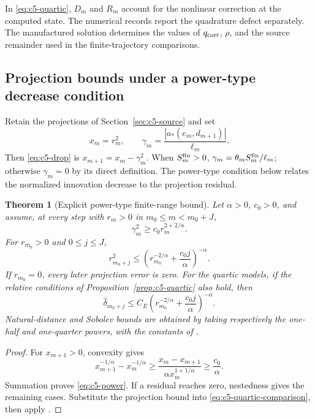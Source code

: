 \documentclass[11pt]{article}
\newtheorem{theorem}{Theorem}[section]
\theoremstyle{remark}
\begin{document}
In \eqref{eq:c5-quartic}, \(D_m\) and \(R_m\) account for the nonlinear correction at the computed state. The numerical records report the quadrature defect separately. The manufactured solution determines the values of \(q_{\rm corr}\), \(\rho\), and the source remainder used in the finite-trajectory comparisons.

\subsection{Projection bounds under a power-type decrease condition}
\label{sec:c5-power}

Retain the projections of Section~\ref{sec:c5-source} and set
\[
 x_m=r_m^2,\qquad
 \gamma_m=\frac{|a_*(e_m,d_{m+1})|}{\ell_m}.
\]
Then \eqref{eq:c5-drop} is $x_{m+1}=x_m-\gamma_m^2$.
When $S_m^{\rm fin}>0$, $\gamma_m=\theta_mS_m^{\rm fin}/\ell_m$;
otherwise $\gamma_m=0$ by its direct definition.
The power-type condition below relates the normalized innovation decrease to the projection residual.

\begin{theorem}[Explicit power-type finite-range bound]
\label{thm:c5-power}
Let $\alpha>0$, $c_0>0$, and assume, at every step with $r_m>0$
in $m_0\leq m<m_0+J$,
\begin{equation}
 \gamma_m^2\geq c_0r_m^{2+2/\alpha}.
 \label{eq:c5-power-condition}
\end{equation}
For $r_{m_0}>0$ and $0\leq j\leq J$,
\begin{equation}
 r_{m_0+j}^2\leq
 \left(r_{m_0}^{-2/\alpha}+\frac{c_0j}{\alpha}\right)^{-\alpha}.
 \label{eq:c5-power}
\end{equation}
If $r_{m_0}=0$, every later projection error is zero.
For the quartic models, if the relative conditions of
Proposition~\ref{prop:c5-quartic} also hold, then
\begin{equation}
 \widehat\delta_{m_0+j}\leq C_E
 \left(r_{m_0}^{-2/\alpha}+\frac{c_0j}{\alpha}\right)^{-\alpha}.
 \label{eq:c5-power-energy}
\end{equation}
Natural-distance and Sobolev bounds are obtained by taking respectively
the one-half and one-quarter powers, with the constants of
\CGAEnergyTheoremReference.
\end{theorem}
\begin{proof}
For $x_{m+1}>0$, convexity gives
\[
 x_{m+1}^{-1/\alpha}-x_m^{-1/\alpha}
 \geq\frac{x_m-x_{m+1}}{\alpha x_m^{1+1/\alpha}}
 \geq\frac{c_0}{\alpha}.
\]
Summation proves \eqref{eq:c5-power}. If a residual reaches zero,
nestedness gives the remaining cases. Substitute the projection bound
into \eqref{eq:c5-quartic-comparison}, then apply
\CGAEnergyTheoremReference.
\end{proof}
\end{document}
